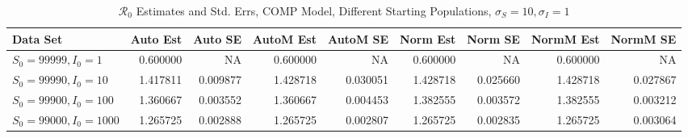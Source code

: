 \documentclass[12pt]{article}
\newcommand{\rr}{\ensuremath{\mathcal{R}_0}}
\begin{document}
\begin{table}[H]
	
	\caption{$\rr$ Estimates and Std. Errs, COMP Model,
		Different Starting Populations, 
		$\sigma_S = 10, \sigma_I = 1$}
	\begin{footnotesize}
		\hskip -1.7cm
	\begin{tabular}{l|r|r|r|r|r|r|r|r}
		\hline
		Data Set & Auto Est & Auto SE & AutoM Est & AutoM SE & Norm Est & Norm SE & NormM Est & NormM SE\\
		\hline
		$S_0 = 99999, I_0 = 1$ & 0.600000 & NA & 0.600000 & NA & 0.600000 & NA & 0.600000 & NA\\
		\hline
		$S_0 = 99990, I_0 = 10$ & 1.417811 & 0.009877 & 1.428718 & 0.030051 & 1.428718 & 0.025660 & 1.428718 & 0.027867\\
		\hline
		$S_0 = 99900, I_0 = 100$ & 1.360667 & 0.003552 & 1.360667 & 0.004453 & 1.382555 & 0.003572 & 1.382555 & 0.003212\\
		\hline
		$S_0 = 99000, I_0 = 1000$ & 1.265725 & 0.002888 & 1.265725 & 0.002807 & 1.265725 & 0.002835 & 1.265725 & 0.003064\\
		\hline
	\end{tabular}
\end{footnotesize}
\end{table}
\end{document}
